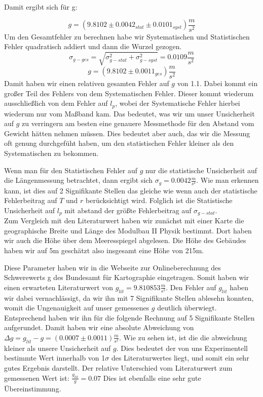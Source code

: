 \documentclass[twoside]{protokoll}
\begin{document}
Damit ergibt sich für g:

\begin{equation}
    g = (9.8102 \pm 0.0042_{stat} \pm 0.0101_{syst}) \frac{m}{s^2}
\end{equation}
Um den Gesamtfehler zu berechnen habe wir Systematischen und Statistischen Fehler quadratisch addiert und dann die Wurzel gezogen.
\begin{equation}
    \sigma_{g-ges} = \sqrt{\sigma_{g-stat}^2 + \sigma_{g-syst}^2} = 0.0109 \frac{m}{s^2}
\end{equation}
\begin{equation}
    g = (9.8102 \pm 0.0011_{ges}) \frac{m}{s^2}
\end{equation}
Damit haben wir einen relativen gesamten Fehler auf $g$ von 1.1\textperthousand.
Dabei kommt ein großer Teil des Fehlers von dem Systematischen Fehler.
Dieser kommt wiederum ausschließlich von dem Fehler auf $l_p$, wobei der Systematische Fehler hierbei wiederum nur vom Maßband kam.
Das bedeutet, was wir um unser Unsicherheit auf $g$ zu verringern am besten eine genauere Messmethode für den Abstand vom Gewicht hätten nehmen müssen.
Dies bedeutet aber auch, das wir die Messung oft genung durchgefüht haben, um den statistischen Fehler kleiner als den Systematischen zu bekommen.

Wenn man für den Statistischen Fehler auf $g$ nur die statistische Unsicherheit auf die Längenmessung betrachtet, dann ergibt sich $\sigma_{g} = 0.0042 \frac{m}{s^2}$.
Wie man erkennen kann, ist dies auf 2 Signifikante Stellen das gleiche wie wenn auch der statistische Fehlerbeitrag auf $T$ und $r$ berücksichtigt wird.
Folglich ist die Statistische Unsicherheit auf $l_p$ mit abstand der größte Fehlerbeitrag auf $\sigma_{g-stat}$. \\


Zum Vergleich mit den Literaturwert haben wir zunächst mit einer Karte die geographische Breite und Länge des Modulbau II Physik bestimmt.
Dort haben wir auch die Höhe über dem Meeresspiegel abgelesen. 
Die Höhe des Gebäudes haben wir auf 5m geschätzt also insgesamt eine Höhe von 215m.

Diese Parameter haben wir in die Webseite zur Onlineberechnung des Schwerewerts g des Bundesamt für Kartographie eingetragen. 
Somit haben wir einen erwarteten Literaturwert von $g_{lit} = 9.810853 \frac{m}{s^2}$.
Den Fehler auf $g_{lit}$ haben wir dabei vernachlässigt, da wir ihn mit 7 Signifikante Stellen ablesehn konnten, womit die Ungenauigkeit auf unser gemessenes $g$ deutlich überwiegt.
Entsprechend haben wir ihn für die folgende Rechnung auf 5 Signifikante Stellen aufgerundet.
Damit haben wir eine absolute Abweichung von $\Delta g = g_{lit} - g = (0.0007 \pm 0.0011) \frac{m}{s^2}$.
Wie zu sehen ist, ist die die abweichung kleiner als unsere Unsicherheit auf $g$.
Dies bedeutet der von uns Experimentell bestimmte Wert innerhalb von 1$\sigma$ des Literaturwertes liegt, und somit ein sehr gutes Ergebnis darstellt.
Der relative Unterschied vom Literaturwert zum gemessenen Wert ist: $\frac{g_{lit}}{g} =  0.07$ \textperthousand
Dies ist ebenfalls eine sehr gute Übereinstimmung.
\end{document}

